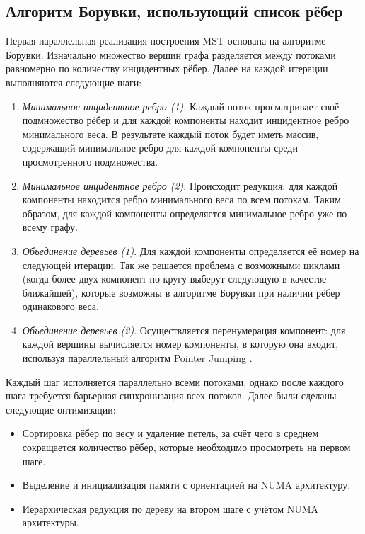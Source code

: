\documentclass{article}
\begin{document}
\subsection{Алгоритм Борувки, использующий список рёбер}
Первая параллельная реализация построения MST основана на алгоритме Борувки. 
Изначально множество вершин графа разделяется между потоками равномерно по количеству инцидентных рёбер.
Далее на каждой итерации выполняются следующие шаги:
\begin{enumerate}
    \item \textit{Минимальное инцидентное ребро (1)}.
          Каждый поток просматривает своё подмножество рёбер и для каждой компоненты находит инцидентное ребро минимального веса. 
          В результате каждый поток будет иметь массив, содержащий минимальное ребро для каждой компоненты среди просмотренного подмножества.
    \item \textit{Минимальное инцидентное ребро (2)}.
          Происходит редукция: для каждой компоненты находится ребро минимального веса по всем потокам. 
          Таким образом, для каждой компоненты определяется минимальное ребро уже по всему графу.
    \item \textit{Объединение деревьев (1)}.
          Для каждой компоненты определяется её номер на следующей итерации.
          Так же решается проблема с возможными циклами (когда более двух компонент по кругу выберут следующую в качестве ближайшей), которые возможны в алгоритме Борувки при наличии рёбер одинакового веса.
    \item \textit{Объединение деревьев (2)}.
          Осуществляется перенумерация компонент: для каждой вершины вычисляется номер компоненты, в которую она входит, используя параллельный алгоритм Pointer Jumping \cite{pointer-jumping}.
\end{enumerate}
Каждый шаг исполняется параллельно всеми потоками, однако после каждого шага требуется барьерная синхронизация всех потоков.
Далее были сделаны следующие оптимизации:
\begin{itemize}
    \item Сортировка рёбер по весу и удаление петель, за счёт чего в среднем сокращается количество рёбер, которые необходимо просмотреть на первом шаге.
    \item Выделение и инициализация памяти с ориентацией на NUMA архитектуру.
    \item Иерархическая редукция по дереву на втором шаге с учётом NUMA архитектуры.
\end{itemize}
\end{document}
